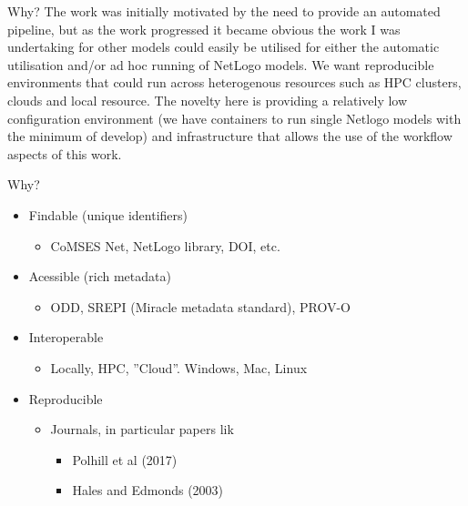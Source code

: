\documentclass[usenames,dvipsnames,10pt]{beamer}
\begin{document}
\begin{frame}{Why?}
{The work was initially motivated by the need to provide an automated pipeline, but as the work progressed it became obvious the work I was undertaking for other models could easily be utilised for either the automatic utilisation  and/or  ad hoc running of NetLogo models.  We want reproducible environments that could run across heterogenous resources such as HPC clusters, clouds and local resource. The novelty here is providing a relatively low configuration environment (we have containers to run single Netlogo models with the minimum of develop) and infrastructure that allows the use of the workflow aspects of this work. 
    }
    \normalsize
\end{frame}
\begin{frame}{Why?}

    \begin{itemize}
        \item Findable (unique identifiers)
            \begin{itemize}
                \item CoMSES Net, NetLogo library, DOI, etc.
            \end{itemize}
        \item Acessible (rich metadata)
            \begin{itemize}
                \item ODD, SREPI (Miracle metadata standard), PROV-O
            \end{itemize}
        \item Interoperable
            \begin{itemize}
                \item Locally, HPC, ”Cloud”. Windows, Mac, Linux
            \end{itemize}
        \item Reproducible
            \begin{itemize}
                \item Journals, in particular papers lik
                \begin{itemize}
                    \item Polhill et al (2017)
                    \item Hales and Edmonds (2003)
                \end{itemize}
            \end{itemize}
    \end{itemize}
\end{frame}
\end{document}
